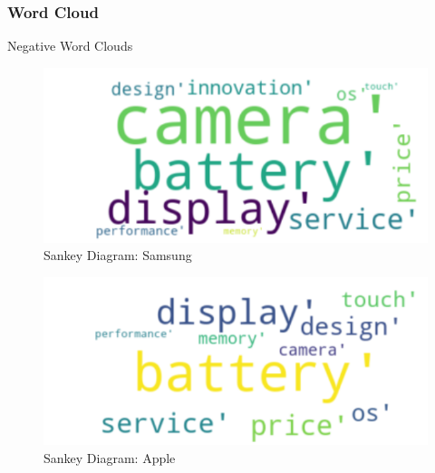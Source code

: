 \documentclass{beamer}
\begin{document}
\begin{frame}
\frametitle{Word Cloud}
{\large Negative Word Clouds}
\begin{figure}
\includegraphics[scale=0.5]{samneg}
\caption{Sankey Diagram: Samsung}
\end{figure}
\begin{figure}
\includegraphics[scale=0.5]{aplneg}
\caption{Sankey Diagram: Apple}
\end{figure}
\end{frame}
\end{document}
